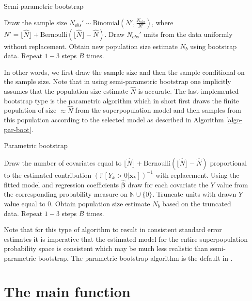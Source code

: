 \documentclass[
]{jss}
\newcommand{\1}{\mathcal{I}} \newcommand{\bZero}{\boldsymbol{0}}
\begin{document}
\begin{algorithm}[ht!]
\small
\caption{Semi-parametric bootstrap}
\label{algo-semipar-boot}\DontPrintSemicolon
{} Draw the sample size $N_{obs}'\sim\text{Binomial}\left(N', \frac{N_{obs}}{N'}\right)$, where $N'=\lfloor\hat{N}\rfloor+\text{Bernoulli}\left(\lfloor\hat{N}\rfloor-\hat{N}\right)$.\;
 Draw $N_{obs}'$ units from the data uniformly without replacement.\;
 Obtain new population size estimate $N_b$ using bootstrap data.\;
 Repeat $1-3$ steps $B$ times.
\end{algorithm}

In other words, we first draw the sample size and then the sample
conditional on the sample size. Note that in using semi-parametric
bootstrap one implicitly assumes that the population size estimate
\(\hat{N}\) is accurate. The last implemented bootstrap type is the
parametric algorithm which in short first draws the finite population of
size \(\approx\hat{N}\) from the superpopulation model and then samples
from this population according to the selected model as described in
Algorithm \ref{algo-par-boot}.

\begin{algorithm}[ht!]
\small
\caption{Parametric bootstrap}
\label{algo-par-boot}\DontPrintSemicolon
{} Draw the number of covariates equal to $\lfloor\hat{N}\rfloor+\text{Bernoulli}\left(\lfloor\hat{N}\rfloor-\hat{N}\right)$ proportional to the estimated contribution $(\mathbb{P}\left[Y_{k}>0|\boldsymbol{x}_{k}\right])^{-1}$ with replacement.\;
 Using the fitted model and regression coefficients $\hat{\boldsymbol{\beta}}$ draw for each covariate the $Y$ value from the corresponding probability measure on $\mathbb{N}\cup\{0\}$.\;
 Truncate units with drawn $Y$ value equal to $0$.\;
 Obtain population size estimate $N_b$ based on the truncated data.\;
 Repeat $1-3$ steps $B$ times.
\end{algorithm}

Note that for this type of algorithm to result in consistent standard
error estimates it is imperative that the estimated model for the entire
superpopulation probability space is consistent which may be much less
realistic than semi-parametric bootstrap. The parametric bootstrap
algorithm is the default in .

\section{The main function}\label{sec-main}
\end{document}
